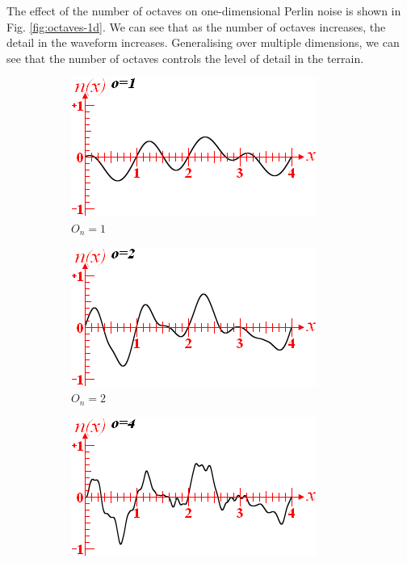 \documentclass[12pt]{article}
\begin{document}
The effect of the number of octaves on one-dimensional Perlin noise is shown in Fig. \ref{fig:octaves-1d}. We can see that as the number of octaves increases, the detail in the waveform increases. Generalising over multiple dimensions, we can see that the number of octaves controls the level of detail in the terrain.

\begin{figure}[ht]
    \centering
    \begin{subfigure}{0.4\textwidth}
        \centering
        \includegraphics[width=\linewidth]{octave1.png}
        \caption{$O_n=1$}
        \label{fig:octave1}
    \end{subfigure}
    \hfill
    \begin{subfigure}{0.4\textwidth}
        \centering
        \includegraphics[width=\linewidth]{octave2.png}
        \caption{$O_n=2$}
        \label{fig:octave2}
    \end{subfigure}
    \hfill
    \begin{subfigure}{0.4\textwidth}
        \centering
        \includegraphics[width=\linewidth]{octave4.png}

\end{subfigure}
\end{figure}
\end{document}
